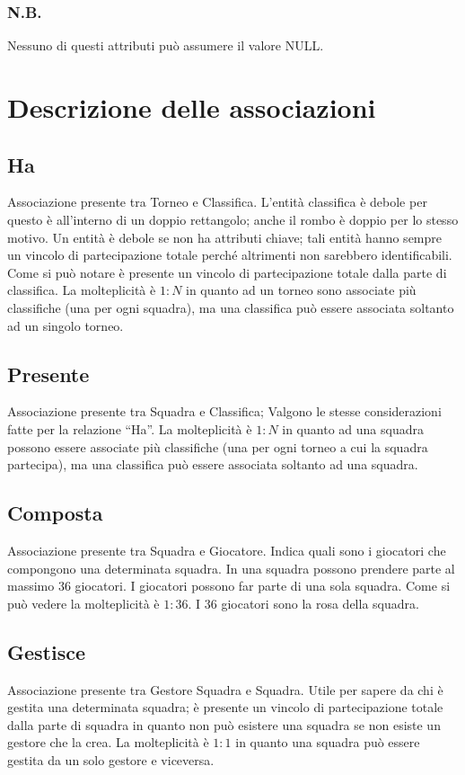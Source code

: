 		\subsubsection*{N.B.}
		Nessuno di questi attributi può assumere il valore NULL.

\section{Descrizione delle associazioni}
	
	\subsection{Ha}
	Associazione presente tra Torneo e Classifica.
	L’entità classifica è debole per questo è all’interno di un doppio rettangolo; anche il rombo è doppio per lo stesso motivo. 
	Un entità è debole se non ha attributi chiave; tali entità hanno sempre un vincolo di partecipazione totale perché altrimenti non sarebbero identificabili. Come si può notare è presente un vincolo di partecipazione totale dalla parte di classifica.
	La molteplicità è $1:N$ in quanto ad un torneo sono associate più classifiche (una per ogni squadra), ma una classifica può essere associata soltanto ad un singolo torneo.
	
	\subsection{Presente}
	Associazione presente tra Squadra e Classifica;
	Valgono le stesse considerazioni fatte per la relazione ``Ha''.
	La molteplicità è $1:N$ in quanto ad una squadra possono essere associate più classifiche (una per ogni torneo a cui la squadra partecipa), ma una classifica può essere associata soltanto ad una squadra.
	
	\subsection{Composta}
	Associazione presente tra Squadra e Giocatore.
	Indica quali sono i giocatori che compongono una determinata squadra. In una squadra possono prendere parte al massimo $36$ giocatori. I giocatori possono far parte di una sola squadra. Come si può vedere la molteplicità è $1: 36$.
	I $36$ giocatori sono la rosa della squadra.
	
	\subsection{Gestisce}
	Associazione presente tra Gestore Squadra e Squadra.
	Utile per sapere da chi è gestita una determinata squadra; è presente un vincolo di partecipazione totale dalla parte di squadra in quanto non può esistere una squadra se non esiste un gestore che la crea.
	La molteplicità è $1:1$ in quanto una squadra può essere gestita da un solo gestore e viceversa.
	
